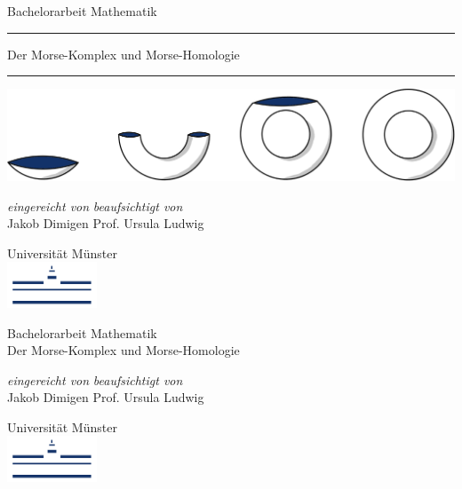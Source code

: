 \documentclass[a4paper,11pt,twoside]{scrreport}
\begin{document}
\makeheaderempty

\begin{titlepage}
    \centering
    Bachelorarbeit Mathematik \\
    \color{DarkBlue}\rule{\linewidth}{1pt}
    \color{Black}\Huge Der Morse-Komplex und Morse-Homologie \\[14pt]
    \color{DarkBlue}\rule{\linewidth}{2pt}
    \color{Black}

    \vspace{3cm}
    \includegraphics[width=\textwidth]{../resources/Me-Titlepage-Color.jpeg}

    \vfill
    \small

    \textit{eingereicht von}
    \hfill
    \textit{beaufsichtigt von} \\
    Jakob Dimigen
    \hfill
    Prof. Ursula Ludwig

    \vspace{2cm}

    Universität Münster \\
    \vspace{0.02cm}
    \includegraphics[width=0.2\textwidth]{../resources/WWU_Logo.png}
\end{titlepage}

\begin{titlepage}
    \centering

    \vspace*{5cm}
    Bachelorarbeit Mathematik \\
    \color{Black}\Huge Der Morse-Komplex und Morse-Homologie \\[14pt]
    \color{Black}

    \vfill
    \small

    \textit{eingereicht von}
    \hfill
    \textit{beaufsichtigt von} \\
    Jakob Dimigen
    \hfill
    Prof. Ursula Ludwig

    \vspace{2cm}

    Universität Münster \\
    \vspace{0.02cm}
    \includegraphics[width=0.2\textwidth]{../resources/WWU_Logo.png}
    \vspace{5cm}
\end{titlepage}
\end{document}
